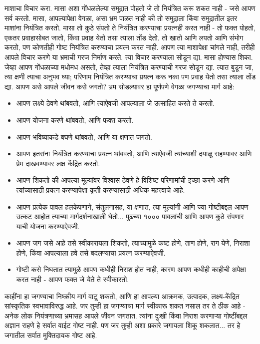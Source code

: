माशाचा विचार करा. मासा अशा गोंधळलेल्या समुद्रात पोहतो जे तो नियंत्रित करू शकत नाही - जसे आपण सर्व करतो. मासा, आपल्यापेक्षा वेगळा, असा भ्रम पाळत नाही की तो समुद्राला किंवा समुद्रातील इतर माशांना नियंत्रित करतो. मासा तो कुठे संपतो ते नियंत्रित करण्याचा प्रयत्नही करत नाही - तो फक्त पोहतो, एकतर प्रवाहासोबत जातो, किंवा प्रवाह येतो तसा त्याला तोंड देतो. तो खातो आणि लपतो आणि संभोग करतो, पण कोणतीही गोष्ट नियंत्रित करण्याचा प्रयत्न करत नाही.
आपण त्या माशापेक्षा चांगले नाही, तरीही आपले विचार करणे या भ्रमाची गरज निर्माण करते.
त्या विचार करण्याला सोडून द्या. मासा होण्यास शिका.
जेव्हा आपण गोंधळाच्या मधोमध असतो, तेव्हा त्याला नियंत्रित करण्याची गरज सोडून द्या. त्यात बुडून जा, त्या क्षणी त्याचा अनुभव घ्या; परिणाम नियंत्रित करण्याचा प्रयत्न करू नका पण प्रवाह येतो तसा त्याला तोंड द्या.
आपण असे आपले जीवन कसे जगतो? भ्रम सोडल्यावर हा पूर्णपणे वेगळा जगण्याचा मार्ग आहे:
\begin{itemize}
\item आपण लक्ष्ये ठेवणे थांबवतो, आणि त्याऐवजी आपल्याला जे उत्साहित करते ते करतो.
\item आपण योजना करणे थांबवतो, आणि फक्त करतो.
\item आपण भविष्याकडे बघणे थांबवतो, आणि या क्षणात जगतो.
\item आपण इतरांना नियंत्रित करण्याचा प्रयत्न थांबवतो, आणि त्याऐवजी त्यांच्याशी दयाळू राहण्यावर आणि प्रेम दाखवण्यावर लक्ष केंद्रित करतो.
\item आपण शिकतो की आपल्या मूल्यांवर विश्वास ठेवणे हे विशिष्ट परिणामांची इच्छा करणे आणि त्यांच्यासाठी प्रयत्न करण्यापेक्षा कृती करण्यासाठी अधिक महत्त्वाचे आहे.
\item आपण प्रत्येक पावल हलकेपणाने, संतुलनासह, या क्षणात, त्या मूल्यांनी आणि ज्या गोष्टीबद्दल आपण उत्कट आहोत त्याच्या मार्गदर्शनाखाली घेतो... पुढच्या १००० पावलांची आणि आपण कुठे संपणार याची योजना करण्याऐवजी.
\item आपण जग जसे आहे तसे स्वीकारायला शिकतो, त्याच्यामुळे कष्ट होणे, ताण होणे, राग येणे, निराशा होणे, किंवा आपल्याला हवे तसे बदलण्याचा प्रयत्न करण्याऐवजी.
\item गोष्टी कसे निघतात त्यामुळे आपण कधीही निराश होत नाही, कारण आपण कधीही काहीची अपेक्षा करत नाही - आपण फक्त जे येते ते स्वीकारतो.
\end{itemize}
काहींना हा जगण्याचा निष्क्रीय मार्ग वाटू शकतो, आणि हा आपल्या आक्रमक, उत्पादक, लक्ष्य-केंद्रित सांस्कृतिक स्वभावाविरुद्ध आहे. जर तुम्ही हा जगण्याचा मार्ग स्वीकारू शकत नसाल तर ते ठीक आहे - अनेक लोक नियंत्रणाच्या भ्रमासह आपले जीवन जगतात. त्यांना दुःखी किंवा निराश करणाऱ्या गोष्टींबद्दल अज्ञान राहणे हे सर्वात वाईट गोष्ट नाही.
पण जर तुम्ही अशा प्रकारे जगायला शिकू शकलात... तर हे जगातील सर्वात मुक्तिदायक गोष्ट आहे.


